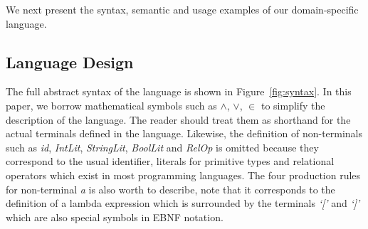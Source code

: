 We next present the syntax, semantic and usage examples of our domain-specific language.

\subsection{Language Design}
The full abstract syntax of the language is shown in Figure~\ref{fig:syntax}. 
In this paper, we borrow mathematical symbols such as $\wedge$, $\vee$, $\in$ to simplify the description of the language.
The reader should treat them as shorthand for the actual terminals defined in the language.
Likewise, the definition of non-terminals such as \textit{id}, \textit{IntLit}, \textit{StringLit}, \textit{BoolLit} and \textit{RelOp} is omitted because they correspond to the usual identifier, literals for primitive types and relational operators which exist in most programming languages.  
The four production rules for non-terminal \textit{a} is also worth to describe, note that it corresponds to the definition of a lambda expression which is surrounded by the terminals \textit{`['} and \textit{`]'} which are also special symbols in EBNF notation.


